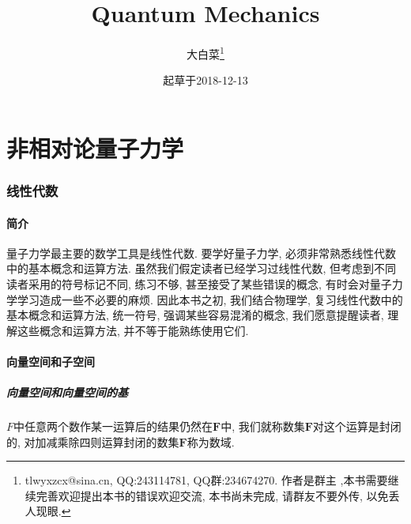 \documentclass[a4paper,11pt]{article}
\begin{document}
\title{Quantum Mechanics}
\author{大白菜\footnote{ tlwyxzcx@sina.cn, QQ:243114781, QQ群:234674270. 作者是群主 ,本书需要继续完善欢迎提出本书的错误欢迎交流, 本书尚未完成, 请群友不要外传, 以免丢人现眼.}}
\date{起草于2018-12-13}
\maketitle
\newpage
\tableofcontents
\thispagestyle{empty}

\newpage
\setcounter{page}{1}
\part{非相对论量子力学}
\section{线性代数}
\subsection{简介}
量子力学最主要的数学工具是线性代数. 要学好量子力学, 必须非常熟悉线性代数中的基本概念和运算方法. 虽然我们假定读者已经学习过线性代数, 但考虑到不同读者采用的符号标记不同, 练习不够, 甚至接受了某些错误的概念, 有时会对量子力学学习造成一些不必要的麻烦. 因此本书之初, 我们结合物理学, 复习线性代数中的基本概念和运算方法, 统一符号, 强调某些容易混淆的概念, 我们愿意提醒读者, 理解这些概念和运算方法, 并不等于能熟练使用它们.
\subsection{向量空间和子空间}
\subsubsection*{向量空间和向量空间的基}
$F$中任意两个数作某一运算后的结果仍然在$\mathbf{F}$中, 我们就称数集$\mathbf{F}$对这个运算是封闭的, 对加减乘除四则运算封闭的数集$\mathbf{F}$称为数域.
\end{document}
